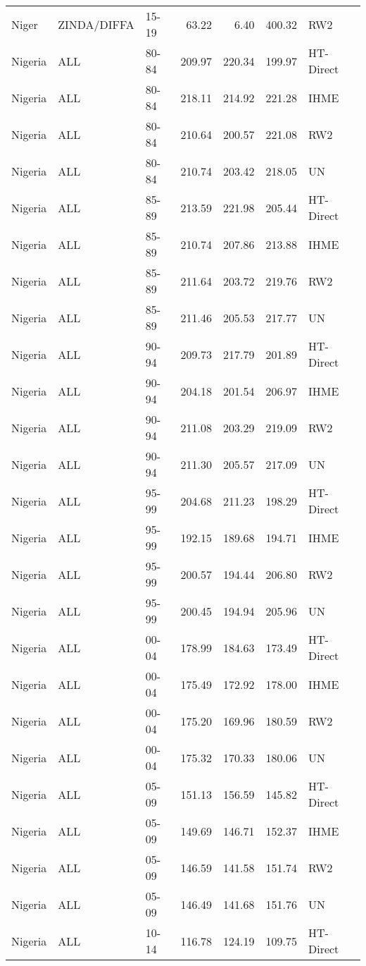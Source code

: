 \begin{longtable}{lllrrrl}
  Niger & ZINDA/DIFFA & 15-19 & 63.22 & 6.40 & 400.32 & RW2 \\ 
  Nigeria & ALL & 80-84 & 209.97 & 220.34 & 199.97 & HT-Direct \\ 
  Nigeria & ALL & 80-84 & 218.11 & 214.92 & 221.28 & IHME \\ 
  Nigeria & ALL & 80-84 & 210.64 & 200.57 & 221.08 & RW2 \\ 
  Nigeria & ALL & 80-84 & 210.74 & 203.42 & 218.05 & UN \\ 
  Nigeria & ALL & 85-89 & 213.59 & 221.98 & 205.44 & HT-Direct \\ 
  Nigeria & ALL & 85-89 & 210.74 & 207.86 & 213.88 & IHME \\ 
  Nigeria & ALL & 85-89 & 211.64 & 203.72 & 219.76 & RW2 \\ 
  Nigeria & ALL & 85-89 & 211.46 & 205.53 & 217.77 & UN \\ 
  Nigeria & ALL & 90-94 & 209.73 & 217.79 & 201.89 & HT-Direct \\ 
  Nigeria & ALL & 90-94 & 204.18 & 201.54 & 206.97 & IHME \\ 
  Nigeria & ALL & 90-94 & 211.08 & 203.29 & 219.09 & RW2 \\ 
  Nigeria & ALL & 90-94 & 211.30 & 205.57 & 217.09 & UN \\ 
  Nigeria & ALL & 95-99 & 204.68 & 211.23 & 198.29 & HT-Direct \\ 
  Nigeria & ALL & 95-99 & 192.15 & 189.68 & 194.71 & IHME \\ 
  Nigeria & ALL & 95-99 & 200.57 & 194.44 & 206.80 & RW2 \\ 
  Nigeria & ALL & 95-99 & 200.45 & 194.94 & 205.96 & UN \\ 
  Nigeria & ALL & 00-04 & 178.99 & 184.63 & 173.49 & HT-Direct \\ 
  Nigeria & ALL & 00-04 & 175.49 & 172.92 & 178.00 & IHME \\ 
  Nigeria & ALL & 00-04 & 175.20 & 169.96 & 180.59 & RW2 \\ 
  Nigeria & ALL & 00-04 & 175.32 & 170.33 & 180.06 & UN \\ 
  Nigeria & ALL & 05-09 & 151.13 & 156.59 & 145.82 & HT-Direct \\ 
  Nigeria & ALL & 05-09 & 149.69 & 146.71 & 152.37 & IHME \\ 
  Nigeria & ALL & 05-09 & 146.59 & 141.58 & 151.74 & RW2 \\ 
  Nigeria & ALL & 05-09 & 146.49 & 141.68 & 151.76 & UN \\ 
  Nigeria & ALL & 10-14 & 116.78 & 124.19 & 109.75 & HT-Direct \\ 

\end{longtable}
